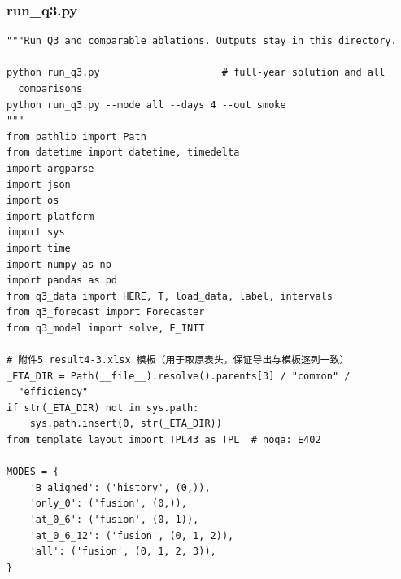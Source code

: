 \subsubsection*{run\_q3.py}
\begin{verbatim}
"""Run Q3 and comparable ablations. Outputs stay in this directory.

python run_q3.py                     # full-year solution and all
  comparisons
python run_q3.py --mode all --days 4 --out smoke
"""
from pathlib import Path
from datetime import datetime, timedelta
import argparse
import json
import os
import platform
import sys
import time
import numpy as np
import pandas as pd
from q3_data import HERE, T, load_data, label, intervals
from q3_forecast import Forecaster
from q3_model import solve, E_INIT

# 附件5 result4-3.xlsx 模板（用于取原表头，保证导出与模板逐列一致）
_ETA_DIR = Path(__file__).resolve().parents[3] / "common" /
  "efficiency"
if str(_ETA_DIR) not in sys.path:
    sys.path.insert(0, str(_ETA_DIR))
from template_layout import TPL43 as TPL  # noqa: E402

MODES = {
    'B_aligned': ('history', (0,)),
    'only_0': ('fusion', (0,)),
    'at_0_6': ('fusion', (0, 1)),
    'at_0_6_12': ('fusion', (0, 1, 2)),
    'all': ('fusion', (0, 1, 2, 3)),
}



\end{verbatim}
